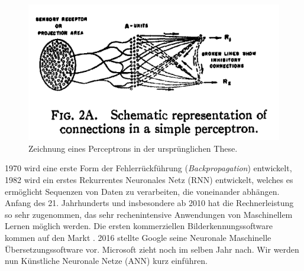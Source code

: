 \documentclass{thesisclass}
\begin{document}
\begin{figure}[H]
  \center
  \includegraphics[width=\textwidth]{images/perceptron.png}
  \caption{Zeichnung eines Perceptrons in der ursprünglichen These. \cite{rosenblatt1958perceptron}}
  \label{fig:perceptron}
\end{figure}
1970 wird eine erste Form der Fehlerrückführung (\textit{\gls{Backpropagation}}) entwickelt\cite{linnainmaa1970representation}, 1982 wird ein erstes Rekurrentes Neuronales Netz (\gls{RNN}) entwickelt, welches es ermöglicht Sequenzen von Daten zu verarbeiten, die voneinander abhängen. Anfang des 21. Jahrhunderts und insbesondere ab 2010 hat die Rechnerleistung so sehr zugenommen, das sehr rechenintensive Anwendungen von Maschinellem Lernen möglich werden. Die ersten kommerziellen Bilderkennungssoftware  kommen auf den Markt \cite{taigman2014deepface}. 2016 stellte Google seine Neuronale Maschinelle Übersetzungssoftware vor. Microsoft zieht noch im selben Jahr nach. \cite{microsoftTranslator}
\newline
\newline
Wir werden nun Künstliche Neuronale Netze (\gls{ANN}) kurz einführen.
\end{document}
